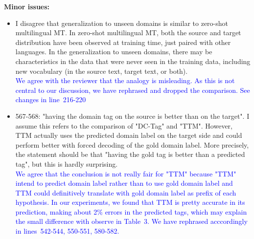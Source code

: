 \documentclass[12pt,times,a4paper,twoside]{article}
\newcommand{\fyTodo}[1]{\Todo[FY:]{\textcolor{orange}{#1}}}
\theoremstyle{definition}
\begin{document}
\noindent\textbf{Minor issues:}
\begin{itemize}
\item I disagree that generalization to unseen domains is similar to zero-shot multilingual MT. In zero-shot multilingual MT, both the source and target distribution have been observed at training time, just paired with other languages. In the generalization to unseen domains, there may be characteristics in the data that were never seen in the training data, including new vocabulary (in the source text, target text, or both).
  \\
  \textcolor{blue}{We agree with the reviewer that the analogy is misleading. As this is not central to our discussion, we have rephrased and dropped the comparison. See changes in line~216-220}\fyTodo{Changes line in.}
\item 567-568: "having the domain tag on the source is better than on the target". I assume this refers to the comparison of "DC-Tag" and "TTM". However, TTM actually uses the predicted domain label on the target side and could perform better with forced decoding of the gold domain label. More precisely, the statement should be that "having the gold tag is better than a predicted tag", but this is hardly surprising.
  \\
  \textcolor{blue}{We agree that the conclusion is not really fair for "TTM" because "TTM" intend to predict domain label rather than to use gold domain label and TTM could definitively translate with gold domain label as prefix of each hypothesis. In our experiments, we found that TTM is pretty accurate in its prediction, making about 2\% errors in the predicted tags, which may explain the small difference with observe in Table~3. We have rephrased acccordingly in lines~542-544, 550-551, 580-582.}\fyTodo{Add lines}
\end{itemize}
\end{document}
